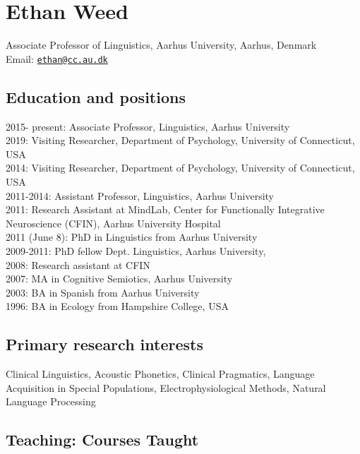 \documentclass[]{article}
\title{}
\author{}
\date{}
\begin{document}
\section{Ethan Weed}\label{ethan-weed}

Associate Professor of Linguistics, Aarhus University, Aarhus, Denmark\\
Email: \href{mailto:ethan@cc.au.dk}{\nolinkurl{ethan@cc.au.dk}}

\subsection{Education and positions}\label{education-and-positions}

2015- present: Associate Professor, Linguistics, Aarhus University\\
2019: Visiting Researcher, Department of Psychology, University of
Connecticut, USA\\
2014: Visiting Researcher, Department of Psychology, University of
Connecticut, USA\\
2011-2014: Assistant Professor, Linguistics, Aarhus University\\
2011: Research Assistant at MindLab, Center for Functionally Integrative
Neuroscience (CFIN), Aarhus University Hospital\\
2011 (June 8): PhD in Linguistics from Aarhus University\\
2009-2011: PhD fellow Dept. Linguistics, Aarhus University,\\
2008: Research assistant at CFIN\\
2007: MA in Cognitive Semiotics, Aarhus University\\
2003: BA in Spanish from Aarhus University\\
1996: BA in Ecology from Hampshire College, USA

\subsection{Primary research
interests}\label{primary-research-interests}

Clinical Linguistics, Acoustic Phonetics, Clinical Pragmatics, Language
Acquisition in Special Populations, Electrophysiological Methods,
Natural Language Processing

\subsection{Teaching: Courses Taught}\label{teaching-courses-taught}
\end{document}
